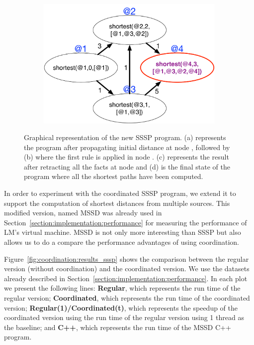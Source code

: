 \begin{figure}
\begin{center}
\begin{subfigure}[b]{0.49\textwidth}
      \caption{}
   \end{subfigure}
   \begin{subfigure}[b]{0.49\textwidth}
      \includegraphics[width=\textwidth]{figures/sssp/coord4}
      \caption{}
   \end{subfigure}
\end{center}
\caption{Graphical representation of the new SSSP program. (a) represents the
   program after propagating initial distance at node , followed by
   (b) where the first rule is applied in node . (c)
   represents the result after retracting all the  facts at node
    and (d) is the final state of the program where all the shortest paths
   have been computed.}
\label{fig:coordination:new_sssp}
\end{figure}

In order to experiment with the coordinated SSSP program, we extend it to
support the computation of shortest distances from multiple sources. This
modified version, named MSSD was already used in
Section~\ref{section:implementation:performance} for measuring the performance
of LM's virtual machine. MSSD is not only more interesting than SSSP but also allows us to do
a compare the performance advantages of using coordination.

Figure~\ref{fig:coordination:results_sssp} shows the comparison between the
regular version (without coordination) and the coordinated version. We use the
datasets already described in Section~\ref{section:implementation:performance}.
In each plot we present the following lines: \textbf{Regular}, which represents
the run time of the regular version; \textbf{Coordinated}, which represents the
run time of the coordinated version; \textbf{Regular(1)/Coordinated(t)}, which
represents the speedup of the coordinated version using the run time of the
regular version using 1 thread as the baseline; and \textbf{C++}, which
represents the run time of the MSSD C++ program.

